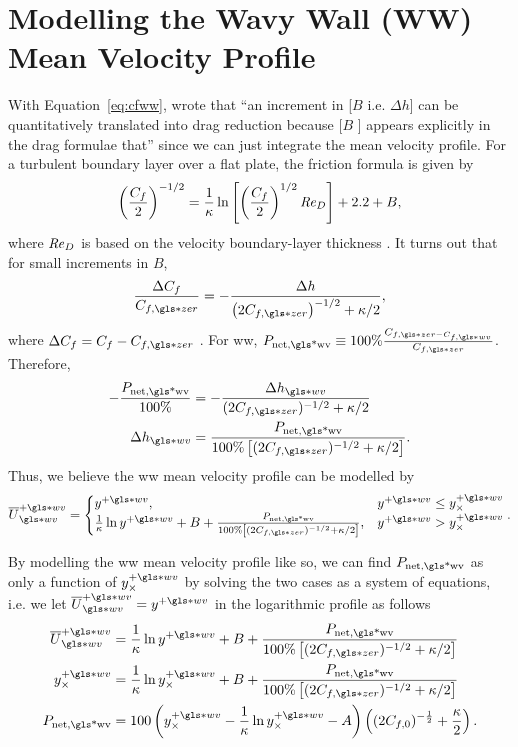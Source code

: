\section{Modelling the Wavy Wall (WW) Mean Velocity Profile}
With Equation~\eqref{eq:cfww}, \textcite{luchini1996} wrote that ``an increment in [$B$ i.e.  $\Delta h$] can be quantitatively translated into drag reduction because [$B$ ] appears explicitly in the drag formulae that'' since we can just integrate the mean velocity profile. For a turbulent boundary layer over a flat plate, the friction formula is given by
\begin{equation}
	\left( \frac{C_f}{2} \right) ^{-1 /2} = \frac{1}{\kappa}\ln \left[ \left( \frac{C_f}{2} \right) ^{1 /2 } \mbox{\textit{Re}}_D \right] + 2.2 + B
,\end{equation}
where $\mbox{\textit{Re}}_D $ is based on the velocity boundary-layer thickness \cite{white1991}. It turns out that for small increments in $B$,
 \begin{equation}
	 \frac{\Delta C_f}{C_{f,\gls*{zer}}}=-\frac{\Delta h}{\left(2C_{f,\gls*{zer}}\right)^{-1 /2} +\kappa /2}
,\end{equation}
where $\Delta C_f=C_f-C_{f,\gls*{zer}}$ \cite{luchini1996}. For \gls{ww}, $P_\text{net,\gls*{wv}} \equiv100\% \frac{C_{f,\gls*{zer}-C_{f,\gls*{wv}}}}{C_{f,\gls*{zer}}}$. Therefore,
\begin{align}
	-\frac{P_\text{net,\gls*{wv}}}{100\%} &=-\frac{\Delta h\ww}{(2C_{f,\gls*{zer}})^{-1 / 2}+\kappa / 2}\\
	\Delta h\ww &= \frac{P_\text{net,\gls*{wv}}}{100\%\left[(2C_{f,\gls*{zer}})^{-1 / 2}+\kappa / 2\right]}
.\end{align}
Thus, we believe the \gls{ww} mean velocity profile can be modelled by
\begin{equation}
	\overline{U}\ww\pw =
	\begin{cases}
		y\pw, & y\pw\leq y_{\times}\pw\\
		\frac{1}{\kappa}\ln y\pw +B +\frac{P_\text{net,\gls*{wv}}}{100\%\left[(2C_{f,\gls*{zer}})^{-1 / 2}+\kappa / 2\right]}, & y\pw>y_{\times}\pw
	\end{cases}
.\end{equation}

By modelling the \gls{ww} mean velocity profile like so, we can find $P_\text{net,\gls*{wv}} $ as only a function of $y_{\times}\pw$ by solving the two cases as a system of equations, i.e. we let $\overline{U}\ww\pw=y\pw$ in the logarithmic profile as follows
\begin{align}
	\overline{U}\pw\ww &=\frac{1}{\kappa}\ln y\pw +B +\frac{P_\text{net,\gls*{wv}}}{100\%\left[(2C_{f,\gls*{zer}})^{-1 / 2}+\kappa / 2\right]} \\
	y_\times\pw &=\frac{1}{\kappa}\ln y_\times\pw +B +\frac{P_\text{net,\gls*{wv}}}{100\%\left[(2C_{f,\gls*{zer}})^{-1 / 2}+\kappa / 2\right]} \\
	P_\text{net,\gls*{wv}} &=100\left(  y_{\times}\pw - \frac{1}{\kappa}\ln y_{\times}\pw - A \right) \left( (2C_{f,0})^{-\frac{1}{2}} +\frac{\kappa}{2} \right) 
.\end{align}

